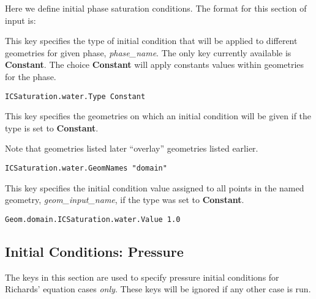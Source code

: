 Here we define initial phase saturation conditions.
The format for this section of input is:

{
This key specifies the type of initial condition that will be applied
to different geometries for given phase, {\em phase\_name}.  The only
key currently available is {\bf Constant}.  The choice {\bf Constant}
will apply constants values within geometries for the phase. 
}
\begin{display}\begin{verbatim}
ICSaturation.water.Type Constant
\end{verbatim}\end{display}

{
This key specifies the geometries on which an initial condition will be
given if the type is set to {\bf Constant}.

Note that geometries listed later ``overlay'' geometries listed earlier.
}
\begin{display}\begin{verbatim}
ICSaturation.water.GeomNames "domain"
\end{verbatim}\end{display}

{
This key specifies the initial condition value assigned to all points in
the named geometry, {\em geom\_input\_name}, if the type was set to
{\bf Constant}.
}
\begin{display}\begin{verbatim}
Geom.domain.ICSaturation.water.Value 1.0
\end{verbatim}\end{display}


\subsection{Initial Conditions: Pressure}
\label{Initial Conditions: Pressure}

The keys in this section are used to specify pressure initial conditions for 
Richards' equation cases {\em only}.  These keys will be ignored if any other
case is run.

